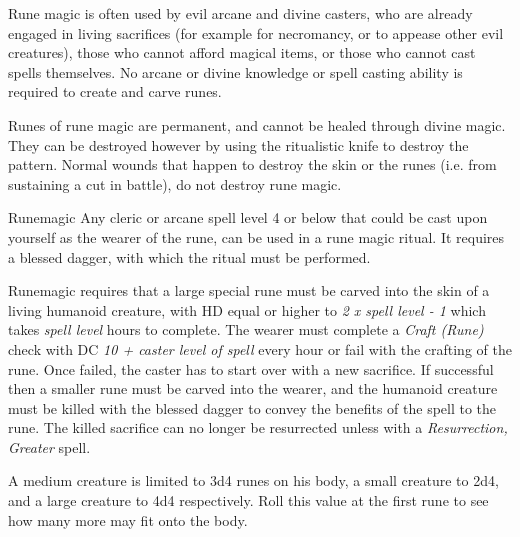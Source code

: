 Rune magic is often used by evil arcane and divine casters, who are already
engaged in living sacrifices (for example for necromancy, or to appease other
evil creatures), those who cannot afford magical items, or those who cannot
cast spells themselves. No arcane or divine knowledge or spell casting ability
is required to create and carve runes.

Runes of rune magic are permanent, and cannot be healed through divine magic.
They can be destroyed however by using the ritualistic knife to destroy the
pattern. Normal wounds that happen to destroy the skin or the runes (i.e. from
sustaining a cut in battle), do not destroy rune magic.

\begin{35e}{Runemagic}
  Any cleric or arcane spell level 4 or below that could be cast upon yourself
  as the wearer of the rune, can be used in a rune magic ritual. It requires a
  blessed dagger, with which the ritual  must
  be performed.

  Runemagic requires that a large special rune must be carved into the skin of
  a living humanoid creature, with HD equal or higher to \emph{2 x spell level
    - 1} which takes \emph{spell level} hours to complete. The wearer must
  complete a \emph{Craft (Rune)} check with DC \emph{10 + caster level of
    spell} every hour or fail with the crafting of the rune. Once failed, the
  caster has to start over with a new sacrifice. If successful then a smaller
  rune must be carved into the wearer, and the humanoid creature must be
  killed with the blessed dagger to convey the benefits of the spell to the
  rune. The killed sacrifice can no longer be resurrected unless with a
  \emph{Resurrection, Greater} spell.

  A medium creature is limited to 3d4 runes on his body, a small creature to
  2d4, and a large creature to 4d4 respectively. Roll this value at the first
  rune to see how many more may fit onto the body.
\end{35e}
